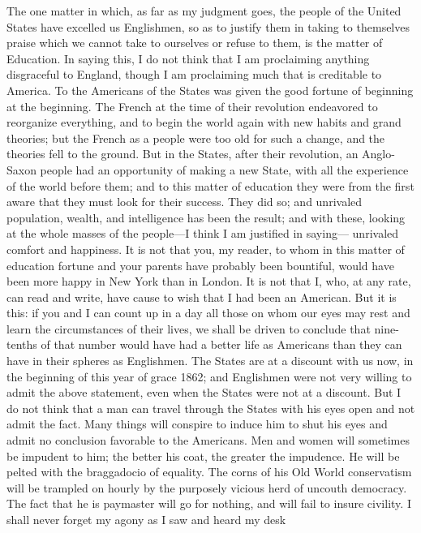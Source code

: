 The one matter in which, as far as my judgment goes, the people of
the United States have excelled us Englishmen, so as to justify
them in taking to themselves praise which we cannot take to
ourselves or refuse to them, is the matter of Education.  In saying
this, I do not think that I am proclaiming anything disgraceful to
England, though I am proclaiming much that is creditable to
America.  To the Americans of the States was given the good fortune
of beginning at the beginning.  The French at the time of their
revolution endeavored to reorganize everything, and to begin the
world again with new habits and grand theories; but the French as a
people were too old for such a change, and the theories fell to the
ground.  But in the States, after their revolution, an Anglo-Saxon
people had an opportunity of making a new State, with all the
experience of the world before them; and to this matter of
education they were from the first aware that they must look for
their success.  They did so; and unrivaled population, wealth, and
intelligence has been the result; and with these, looking at the
whole masses of the people---I think I am justified in saying---%
unrivaled comfort and happiness.  It is not that you, my reader, to
whom in this matter of education fortune and your parents have
probably been bountiful, would have been more happy in New York
than in London.  It is not that I, who, at any rate, can read and
write, have cause to wish that I had been an American.  But it is
this: if you and I can count up in a day all those on whom our eyes
may rest and learn the circumstances of their lives, we shall be
driven to conclude that nine-tenths of that number would have had a
better life as Americans than they can have in their spheres as
Englishmen.  The States are at a discount with us now, in the
beginning of this year of grace 1862; and Englishmen were not very
willing to admit the above statement, even when the States were not
at a discount.  But I do not think that a man can travel through
the States with his eyes open and not admit the fact.  Many things
will conspire to induce him to shut his eyes and admit no
conclusion favorable to the Americans.  Men and women will
sometimes be impudent to him; the better his coat, the greater the
impudence.  He will be pelted with the braggadocio of equality.
The corns of his Old World conservatism will be trampled on hourly
by the purposely vicious herd of uncouth democracy.  The fact that
he is paymaster will go for nothing, and will fail to insure
civility.  I shall never forget my agony as I saw and heard my desk
